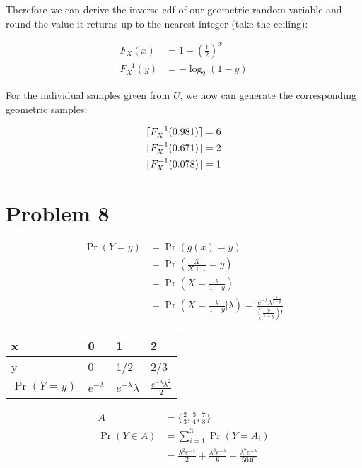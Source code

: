 \documentclass[11pt]{article}
\DeclarePairedDelimiter{\ceil}{\lceil}{\rceil}
\begin{document}
\begin{enumerate}[(a)]
    Therefore we can derive the inverse cdf of our geometric random variable and round the value it returns up to the nearest integer (take the ceiling):

    \begin{align*}
      F_X(x) &= 1 - \left( \frac{1}{2} \right)^x \\
      F_X^{-1}(y) &= -\log_2{(1-y)}
    \end{align*}

    For the individual samples given from $U$, we now can generate the corresponding geometric samples:

    \begin{align*}
      \ceil{F_X^{-1}(0.981)} &= 6 \\
      \ceil{F_X^{-1}(0.671)} &= 2 \\
      \ceil{F_X^{-1}(0.078)} &= 1
    \end{align*}
    
\end{enumerate}

\section*{Problem 8}

\begin{align*}
  \Pr(Y = y) &= \Pr(g(x) = y) \\
  &= \Pr \left( \frac{X}{X+1} = y \right) \\
  &= \Pr \left( X = \frac{y}{1-y} \right) \\
  &= \Pr \left( X = \frac{y}{1-y} \bigg| \lambda \right) = \frac{e^{-\lambda} \lambda^{\frac{y}{1-y}}}{\left( \frac{y}{1-y}\right)!}
\end{align*}

\begin{center}
  \begin{tabular}{ | l | l | l | l | }
    \hline
    x & 0 & 1 & 2 \\ \hline
    y & 0 & 1/2 & 2/3 \\ \hline
    $\Pr(Y = y)$ & $e^{-\lambda}$ & $e^{-\lambda} \lambda$ & $\frac{e^{-\lambda} \lambda^2}{2}$ \\
    \hline
  \end{tabular}
\end{center}

\begin{align*}
  A &= \bigg\{ \frac{2}{3}, \frac{3}{4}, \frac{7}{8} \bigg\} \\
  \Pr(Y \in A) &= \sum_{i=1}^3 \Pr(Y = A_i) \\
  &= \frac{\lambda^2 e^{-\lambda}}{2} + \frac{\lambda^3 e^{-\lambda}}{6} + \frac{\lambda^7 e^{-\lambda}}{5040}
\end{align*}
\end{document}
